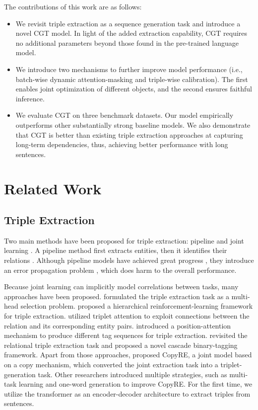 \documentclass[letterpaper]{article} \usepackage{aaai21}  \usepackage{times}  \usepackage{helvet} \usepackage{courier}  \usepackage[hyphens]{url}  \usepackage{graphicx} \urlstyle{rm} \def\UrlFont{\rm}  \usepackage{natbib}  \usepackage[noend]{algpseudocode}
\begin{document}
The contributions of this work are as follows: 
\begin{itemize}
    \item We revisit triple extraction as a sequence generation task and introduce a novel CGT model. In light of the added extraction capability, CGT requires no additional parameters beyond those found in the pre-trained language model.
    \item We introduce two mechanisms to further improve model performance (i.e., batch-wise dynamic attention-masking and triple-wise calibration). The first enables joint optimization of different objects, and the second ensures faithful inference.
    \item We evaluate CGT on three benchmark datasets. Our model empirically outperforms other substantially strong baseline models. We also demonstrate that CGT is better than existing triple extraction approaches at capturing long-term dependencies, thus, achieving better performance with long sentences.
\end{itemize}
 
\section{Related Work}
\subsection{Triple Extraction}
Two main methods have been proposed for triple extraction: pipeline \cite{Nadeau2007ASO,bunescu2005shortest,lin2016neural,lin2017neural,li-etal-2020-logic,wang2020finding} and joint learning \cite{miwa2016end,katiyar2017going,cao-etal-2017-bridge,zhang-etal-2020-openue,dai2019joint}. A pipeline method first extracts entities, then it identifies their relations \cite{hendrickx2019semeval,zeng2015distant}. Although pipeline models have achieved great progress \cite{zhang2018capsule,he2018see,zhang2019long,zhang2020relation}, they introduce an error propagation problem \cite{li2014incremental}, which does harm to the overall performance.

Because joint learning can implicitly model correlations between tasks, many approaches have been proposed. \citet{bekoulis2018joint} formulated the triple extraction task as a multi-head selection problem. \citet{takanobu2019hierarchical} proposed a hierarchical reinforcement-learning framework for triple extraction. \citet{chen2019mrmep} utilized triplet attention to exploit connections between the relation and its corresponding entity pairs. \citet{2019Joint} introduced a position-attention mechanism to produce different tag sequences for triple extraction.\citet{wei2019joint} revisited the relational triple extraction task and proposed a novel cascade binary-tagging framework. Apart from those approaches, \citet{zeng2018extracting} proposed CopyRE, a joint model based on a copy mechanism, which converted the joint extraction task into a triplet-generation task. Other researchers  introduced multiple strategies, such as multi-task learning \cite{zeng2020copymtl} and one-word generation \cite{nayak2019effective} to improve CopyRE. For the first time, we utilize the transformer as an encoder-decoder architecture to extract triples from sentences.
\end{document}
